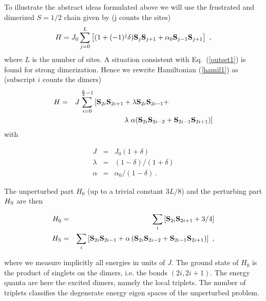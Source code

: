 To illustrate the abstract ideas formulated above we will
use the frustrated and dimerized $S=1/2$ chain given by (j counts the sites)
\begin{equation}
\label{hamil1}
H = J_0\sum_{j=0}^{L}\left[ (1+(-1)^j \delta) {\bf S}_j{\bf S}_{j+1}
+\alpha_0{\bf S}_{j-1}{\bf S}_{j+1}\right] \ ,
\end{equation}
where $L$ is the number of sites. A situation consistent with
Eq.~(\ref{outset1}) is found
for strong dimerization. Hence we rewrite Hamiltonian (\ref{hamil1}) as 
(subscript $i$ counts the dimers)
\begin{eqnarray}
\nonumber
H &=& J\sum_{i=0}^{\frac{L}{2}-1} \left[ {\bf S}_{2i}{\bf S}_{2i+1}+ \lambda
{\bf S}_{2i}{\bf S}_{2i-1} +\right.\qquad\qquad\qquad\\\label{hamil2}
&& \qquad\qquad \qquad\lambda\left.
\alpha({\bf S}_{2i}{\bf S}_{2i-2}+{\bf S}_{2i-1}{\bf S}_{2i+1})\right] 
\end{eqnarray}
with 
\begin{mathletters}
\label{substitution}
\begin{eqnarray}
J &=& J_0(1+\delta)\\
\lambda  &=& (1-\delta)/(1+\delta)\\
\alpha &=& \alpha_0/(1-\delta) \ .
\end{eqnarray}
\end{mathletters}
The unperturbed part $H_0$ 
(up to a trivial constant $3L/8$)
and the perturbing part $H_{\rm S}$ are then 
\begin{mathletters}
\label{H_ges}
\begin{eqnarray}
\label{H0_1}
H_0 &=& \sum_i \left[ {\bf S}_{2i}{\bf S}_{2i+1}+3/4 \right]\\\label{HS_1}
H_{\rm S} &=& \sum_i \left[{\bf S}_{2i}{\bf S}_{2i-1} +
\alpha\left({\bf S}_{2i}{\bf S}_{2i-2}+{\bf S}_{2i-1}{\bf S}_{2i+1}
\right)\right] \ ,
\end{eqnarray}
\end{mathletters}
where we measure implicitly all energies in units of $J$.
The ground state of $H_0$ is the product of singlets on the
dimers, i.e. the bonds $(2i,2i+1)$.
The energy quanta are here the excited dimers, namely the local triplets.
The number of triplets classifies the degenerate energy eigen spaces
of the unperturbed problem.

